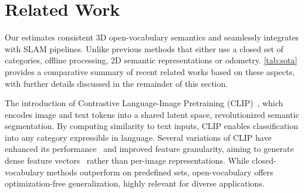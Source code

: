 \section{Related Work}
\label{sec:related}
Our \ours estimates consistent 3D open-vocabulary semantics and seamlessly integrates with SLAM pipelines. Unlike previous methods that either use a closed set of categories, offline processing, 2D semantic representations or odometry. \cref{tab:sota} provides a comparative summary of recent related works based on these aspects, with further details discussed in the remainder of this section.

The introduction of Contrastive Language-Image Pretraining (CLIP)~\cite{radford2021clip}, which encodes image and text tokens into a shared latent space, revolutionized semantic segmentation.
By computing similarity to text inputs, CLIP enables classification into any category expressible in language.
Several variations of CLIP have enhanced its performance~\cite{zhai2023siglip,  cherti2023openclip} and improved feature granularity, aiming to generate dense feature vectors~\cite{zhou2022extract, sun2024alpha} rather than per-image representations. 
While closed-vocabulary methods outperform on predefined sets, open-vocabulary offers optimization-free generalization, highly relevant for diverse applications.

%


